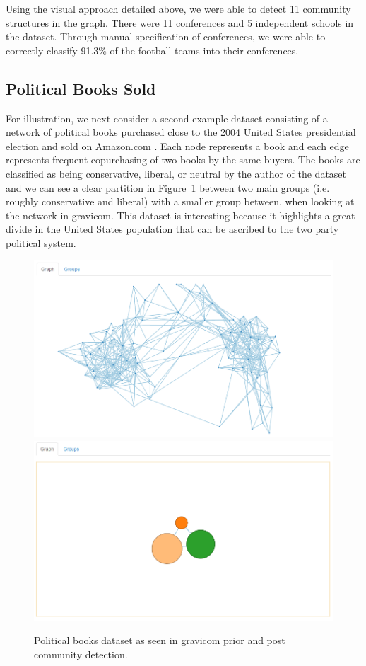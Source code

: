 \documentclass{article}\usepackage[]{graphicx}\usepackage[]{color}
\begin{document}
Using the visual approach detailed above, we were able to detect 11 community structures in the graph. There were 11 conferences and 5 independent schools in the dataset. Through manual specification of conferences, we were able to correctly classify 91.3\% of the football teams into their conferences. 

\subsection{Political Books Sold}
For illustration, we next consider a second example dataset consisting of a network of political books purchased close to the 2004 United States presidential election and sold on Amazon.com \cite{polbooks}. Each node represents a book and each edge represents frequent copurchasing of two books by the same buyers. The books are classified as being conservative, liberal, or neutral by the author of the dataset \cite{krebs2004divided} and we can see a clear partition in Figure~\ref{fig:polbooks_1} between two main groups (i.e. roughly conservative and liberal) with a smaller group between, when looking at the network in gravicom. This dataset is interesting because it highlights a great divide in the United States population that can be ascribed to the two party political system. 

\begin{figure}[H]
\centering
\includegraphics[width=\textwidth]{images/polbooks_1.png}
\includegraphics[width=\textwidth]{images/polbooks_2.png}
\caption{\label{fig:polbooks_1} Political books dataset as seen in gravicom prior and post community detection.}
\end{figure}
\end{document}

